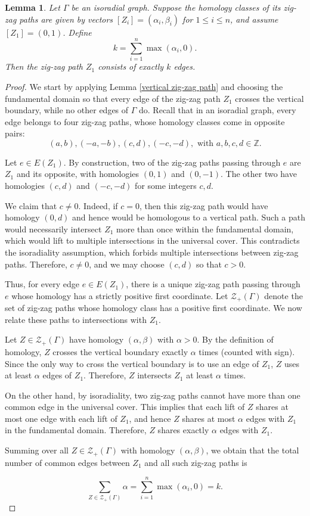\documentclass[12pt,a4paper]{article}
\newtheorem{lem}[thm]{Lemma}
\theoremstyle{definition}
\begin{document}
\begin{lem} \label{fundamental_domain matching}
    Let $\Gamma$ be an isoradial graph.  
    Suppose the homology classes of its zig-zag paths are given by vectors $[Z_i] = (\alpha_i, \beta_i)$ for $1 \leq i \leq n$, and assume $[Z_1] = (0,1)$. Define \[k = \sum_{i=1}^n \max(\alpha_i,0).\] 
    Then the zig-zag path $Z_1$ consists of exactly $k$ edges.
\end{lem}

\begin{proof}
    We start by applying Lemma \ref{vertical zig-zag path} and choosing the fundamental domain so that every edge of the zig-zag path $Z_1$ crosses the vertical boundary, while no other edges of $\Gamma$ do. Recall that in an isoradial graph, every edge belongs to four zig-zag paths, whose homology classes come in opposite pairs: \[(a,b), (-a,-b), (c,d), (-c,-d), \text{ with } a,b,c,d \in \mathbb{Z}.\] 

    Let $e \in E(Z_1)$. By construction, two of the zig-zag paths passing through $e$ are $Z_1$ and its opposite, with homologies $(0,1)$ and $(0,-1)$. The other two have homologies $(c,d)$ and $(-c,-d)$ for some integers $c,d$. 

    We claim that $c \neq 0$. Indeed, if $c=0$, then this zig-zag path would have homology $(0,d)$ and hence would be homologous to a vertical path. Such a path would necessarily intersect $Z_1$ more than once within the fundamental domain, which would lift to multiple intersections in the universal cover. This contradicts the isoradiality assumption, which forbids multiple intersections between zig-zag paths. Therefore, $c \neq 0$, and we may choose $(c,d)$ so that $c>0$.

    Thus, for every edge $e \in E(Z_1)$, there is a unique zig-zag path passing through $e$ whose homology has a strictly positive first coordinate. Let $\mathcal Z_+(\Gamma)$ denote the set of zig-zag paths whose homology class has a positive first coordinate. We now relate these paths to intersections with $Z_1$.

    Let $Z \in \mathcal Z_+(\Gamma)$ have homology $(\alpha,\beta)$ with $\alpha>0$. By the definition of homology, $Z$ crosses the vertical boundary exactly $\alpha$ times (counted with sign). Since the only way to cross the vertical boundary is to use an edge of $Z_1$, $Z$ uses at least $\alpha$ edges of $Z_1$. Therefore, $Z$ intersects $Z_1$ at least $\alpha$ times.

    On the other hand, by isoradiality, two zig-zag paths cannot have more than one common edge in the universal cover. This implies that each lift of $Z$ shares at most one edge with each lift of $Z_1$, and hence $Z$ shares at most $\alpha$ edges with $Z_1$ in the fundamental domain. Therefore, $Z$ shares exactly $\alpha$ edges with $Z_1$.

    Summing over all $Z \in \mathcal Z_+(\Gamma)$ with homology $(\alpha, \beta)$, we obtain that the total number of common edges between $Z_1$ and all such zig-zag paths is

    \[\sum_{Z \in \mathcal Z_+(\Gamma)} \alpha = \sum_{i=1}^n \max(\alpha_i,0) = k.\] 
\end{proof}
\end{document}
